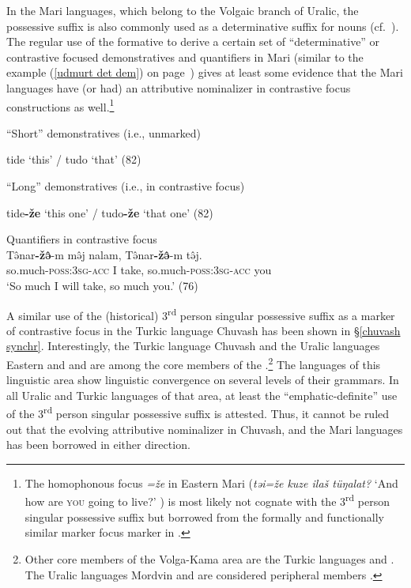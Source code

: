 In the Mari languages, which belong to the Volgaic branch of Uralic, the possessive suffix is also commonly used as a determinative suffix for nouns (cf.~\citealt[75–76]{alhoniemi1993}). The regular use of the formative to derive a certain set of “determinative” or contrastive focused demonstratives and quantifiers in Mari (similar to the  example (\ref{udmurt det dem}) on page~\pageref{udmurt det dem}) gives at least some evidence that the Mari languages have (or had) an attributive nominalizer in contrastive focus constructions as well.\footnote{The homophonous focus  \textit{=že} in Eastern Mari (\textit{təi=že kuze ilaš tüŋalat?} ‘And how are \textsc{you} going to live?’ \citealt[80]{alhoniemi1993}) is most likely not cognate with the 3\textsuperscript{rd} person singular possessive suffix but borrowed from the formally and functionally similar marker focus marker in .}%
\begin{exe}
\ex {}
\begin{xlist}
\ex \rm{“Short” demonstratives (i.e., unmarked)} 
\begin{xlist}
\ex tide \rm{‘this’ /} tudo \rm{‘that’ (82)}
\end{xlist}
\ex \rm{“Long” demonstratives (i.e., in contrastive focus)}
\begin{xlist}
\ex tide\textbf{-že} \rm{‘this one’ /} tudo\textbf{-že} \rm{‘that one’ (82)}%
\end{xlist}
\ex \rm{Quantifiers in contrastive focus}\\
\gll	Tə̂nar\textbf{-žə̂}-m mə̂j nalam, Tə̂nar\textbf{-žə̂}-m tə̂j.\\
	so.much-\textsc{poss:3sg}-\textsc{acc} I take, so.much-\textsc{poss:3sg}-\textsc{acc} you\\
\glt	‘So much I will take, so much you.’ (76)
\end{xlist}
\end{exe}
A similar use of the (historical) 3\textsuperscript{rd} person singular possessive suffix as a marker of contrastive focus in the Turkic language Chuvash has been shown in \S\ref{chuvash synchr}. Interestingly, the Turkic language Chuvash and the Uralic languages Eastern and  and  are among the core members of the .\footnote{Other core members of the Volga-Kama  area are the Turkic languages  and . The Uralic languages Mordvin and  are considered peripheral members \citep{helimski2005}.} The languages of this linguistic area show linguistic convergence on several levels of their grammars. In all Uralic and Turkic languages of that area, at least the “emphatic-definite” use of the 3\textsuperscript{rd} person singular possessive suffix is attested. Thus, it cannot be ruled out that the evolving attributive nominalizer in Chuvash,  and the Mari languages has been borrowed in either direction.%

